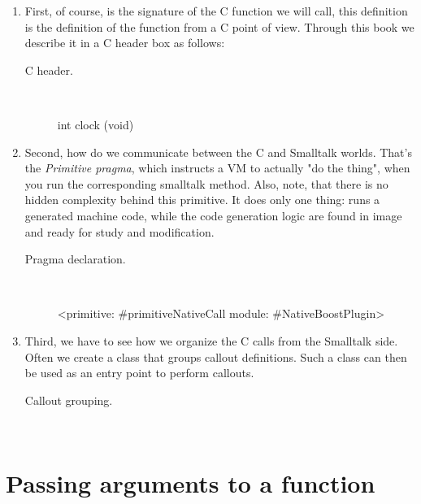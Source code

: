 \documentclass[a4paper,10pt,twoside]{book}
\begin{document}
\begin{enumerate}

\item First, of course, is the signature of the C function we will call, this definition is the definition of the function from a C point of view. Through this book we describe it in a C header box as follows:

\begin{description}
\item [C header.] \ 

\begin{code}{}
int clock (void)
\end{code}
\end{description}


\item Second, how do we communicate between the C and Smalltalk worlds. That's the \emph{Primitive pragma}, which instructs a VM to actually "do the thing", when you run the corresponding smalltalk method. Also, note, that there is no hidden complexity behind this primitive. It does only one thing: runs a generated machine code, while the code generation logic are found in image and ready for study and modification.

\begin{description}
\item [Pragma declaration.] \ 

\begin{code}{}
	<primitive: #primitiveNativeCall module: #NativeBoostPlugin>
\end{code}

\end{description}

\item Third, we have to see how we organize the C calls from the Smalltalk side. Often we create a class that groups callout definitions. Such a class can then be used as an entry point to perform callouts.

\begin{description}
\item [Callout grouping.] \

\end{description}

\end{enumerate}

\section{Passing arguments to a function}
\end{document}
